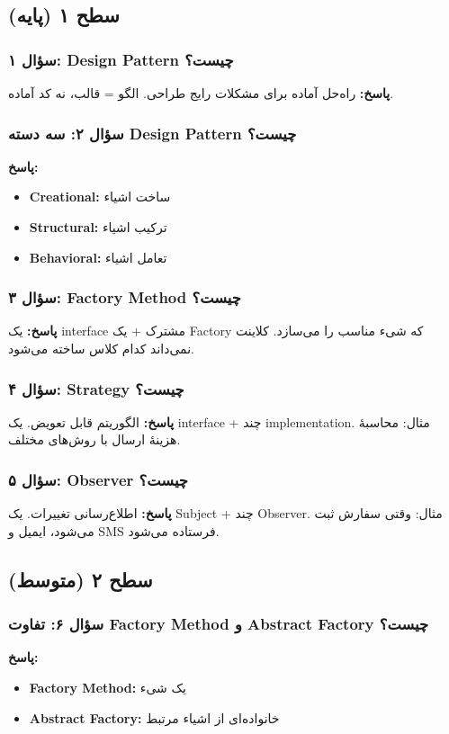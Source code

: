 \documentclass[12pt, a4paper]{article}
\begin{document}
\subsection{سطح ۱ (پایه)}

\subsubsection{سؤال ۱: Design Pattern چیست؟}
\textbf{پاسخ:} راه‌حل آماده برای مشکلات رایج طراحی. الگو = قالب، نه کد 
آماده.

\subsubsection{سؤال ۲: سه دسته Design Pattern چیست؟}
\textbf{پاسخ:}
\begin{itemize}
    \item \textbf{Creational:} ساخت اشیاء
    \item \textbf{Structural:} ترکیب اشیاء
    \item \textbf{Behavioral:} تعامل اشیاء
\end{itemize}

\subsubsection{سؤال ۳: Factory Method چیست؟}
\textbf{پاسخ:} یک interface مشترک + یک Factory که شیء مناسب را می‌سازد. 
کلاینت نمی‌داند کدام کلاس ساخته می‌شود.

\subsubsection{سؤال ۴: Strategy چیست؟}
\textbf{پاسخ:} الگوریتم قابل تعویض. یک interface + چند implementation. 
مثال: محاسبهٔ هزینهٔ ارسال با روش‌های مختلف.

\subsubsection{سؤال ۵: Observer چیست؟}
\textbf{پاسخ:} اطلاع‌رسانی تغییرات. یک Subject + چند Observer. مثال: وقتی 
سفارش ثبت می‌شود، ایمیل و SMS فرستاده می‌شود.

\subsection{سطح ۲ (متوسط)}

\subsubsection{سؤال ۶: تفاوت Factory Method و Abstract Factory چیست؟}
\textbf{پاسخ:}
\begin{itemize}
    \item \textbf{Factory Method:} یک شیء
    \item \textbf{Abstract Factory:} خانواده‌ای از اشیاء مرتبط
\end{itemize}
\end{document}
